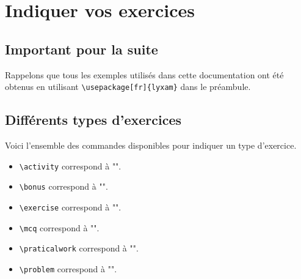 \documentclass[12pt,a4paper]{scrartcl}
\begin{document}
\newcommand\exosoptions{
\IDkey{pts} le nombre de points avec le cas particulier de $0$ qui demande d'afficher "Non noté".

\IDkey{time} la durée de l'exercice.

\IDkey{id} un texte de votre choix pour remplacer le numéro (ceci a pour effet de bloquer temporairement la numérotation).

\IDkey{title} un titre.

\IDkey{about} une petite indication liée à l'exercice (comme par exemple qu'il ne s'adresse qu'aux élèves motivés).

\IDkey{src} la source utilisée pour confectionner l'exercice.
}


\section{Indiquer vos exercices}

    \subsection{Important pour la suite}


Rappelons que tous les exemples utilisés dans cette documentation ont été obtenus en utilisant \verb+\usepackage[fr]{lyxam}+ dans le préambule.


    \subsection{Différents types d'exercices}

Voici l'ensemble des commandes disponibles pour indiquer un type d'exercice.

\begin{itemize}
\makeatletter
    \item \verb+\activity+ correspond à "\lyxam@text@activity{}".
    
    \item \verb+\bonus+ correspond à "\lyxam@text@bonus{}".
    
    \item \verb+\exercise+ correspond à "\lyxam@text@exercise{}".
    
    \item \verb+\mcq+ correspond à "\lyxam@text@mcq{}".
    
    \item \verb+\praticalwork+ correspond à "\lyxam@text@praticalwork{}".
    
    \item \verb+\problem+ correspond à "\lyxam@text@problem{}".
\makeatother
\end{itemize}
\end{document}
